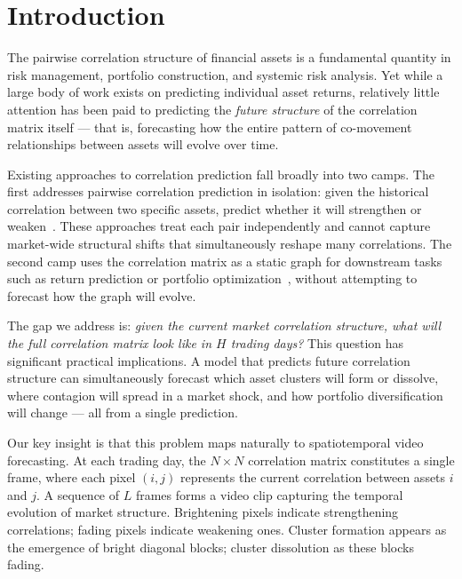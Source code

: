 \documentclass[runningheads]{llncs}
\begin{document}
\section{Introduction}\label{sec:introduction}

The pairwise correlation structure of financial assets is a fundamental
quantity in risk management, portfolio construction, and systemic risk
analysis. Yet while a large body of work exists on predicting individual
asset returns, relatively little attention has been paid to predicting
the \textit{future structure} of the correlation matrix itself --- that
is, forecasting how the entire pattern of co-movement relationships
between assets will evolve over time.

Existing approaches to correlation prediction fall broadly into two camps.
The first addresses pairwise correlation prediction in isolation: given
the historical correlation between two specific assets, predict whether
it will strengthen or weaken~\cite{engle2002dynamic,ledoit2004honey}.
These approaches treat each pair independently and cannot capture
market-wide structural shifts that simultaneously reshape many
correlations. The second camp uses the correlation matrix as a static
graph for downstream tasks such as return prediction or portfolio
optimization~\cite{chen2018incorporating,li2021modeling}, without
attempting to forecast how the graph will evolve.

The gap we address is: \textit{given the current market correlation
structure, what will the full correlation matrix look like in $H$ trading
days?} This question has significant practical implications. A model
that predicts future correlation structure can simultaneously forecast
which asset clusters will form or dissolve, where contagion will spread
in a market shock, and how portfolio diversification will change ---
all from a single prediction.

Our key insight is that this problem maps naturally to spatiotemporal
video forecasting. At each trading day, the $N \times N$ correlation
matrix constitutes a single frame, where each pixel $(i,j)$ represents
the current correlation between assets $i$ and $j$. A sequence of $L$
frames forms a video clip capturing the temporal evolution of market
structure. Brightening pixels indicate strengthening correlations; fading
pixels indicate weakening ones. Cluster formation appears as the emergence
of bright diagonal blocks; cluster dissolution as these blocks fading.
\end{document}
